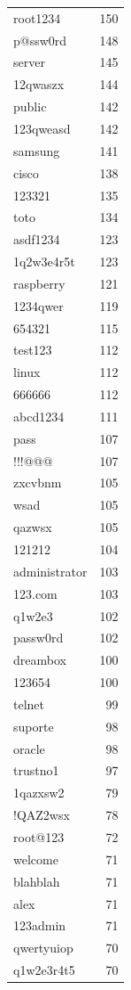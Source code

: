 \documentclass[12pt, oneside]{book}
\begin{document}
\begin{longtable}{|l|r|}
root1234&150\\ 
p@ssw0rd&148\\ 
server&145\\ 
12qwaszx&144\\ 
public&142\\ 
123qweasd&142\\ 
samsung&141\\ 
cisco&138\\ 
123321&135\\ 
toto&134\\ 
asdf1234&123\\ 
1q2w3e4r5t&123\\ 
raspberry&121\\ 
1234qwer&119\\ 
654321&115\\ 
test123&112\\ 
linux&112\\ 
666666&112\\ 
abcd1234&111\\ 
pass&107\\ 
!!!@@@&107\\ 
zxcvbnm&105\\ 
wsad&105\\ 
qazwsx&105\\ 
121212&104\\ 
administrator&103\\ 
123.com&103\\ 
q1w2e3&102\\ 
passw0rd&102\\ 
dreambox&100\\ 
123654&100\\ 
telnet&99\\ 
suporte&98\\ 
oracle&98\\ 
trustno1&97\\ 
1qazxsw2&79\\ 
!QAZ2wsx&78\\ 
root@123&72\\ 
welcome&71\\ 
blahblah&71\\ 
alex&71\\ 
123admin&71\\ 
qwertyuiop&70\\ 
q1w2e3r4t5&70\\
\hline
\end{longtable}
	 
\newpage	
\thispagestyle{empty}
\end{document}

